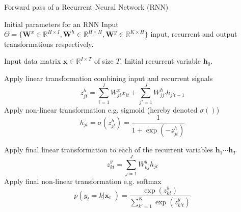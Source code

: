 \begin{algorithm}[th!]
\label{algo:rnnforward}
   \caption{Forward pass of a Recurrent Neural Network (RNN)}
\begin{algorithmic}[1]

    Initial parameters for an RNN Input
$\Theta=\{\mathbf{W}^x \in \mathbb{R}^{H \times I}, \mathbf{W}^h \in \mathbb{R}^{H \times H}, \mathbf{W}^y \in \mathbb{R}^{K \times H} \}$ input, recurrent and output transformations respectively.

    Input data matrix $\mathbf{x} \in \mathbb{R}^{I \times T}$ of size $T$. Initial recurrent variable $\mathbf{h}_0$. 

     \STATE Apply linear transformation combining input and recurrent signals
        $$z_{jt}^h = \sum_{i=1}^{I} W_{ji}^x x_{it} + \sum_{j'=1}^{J} W_{jj'}^h h_{j't-1}$$
     \STATE Apply non-linear transformation e.g. sigmoid (hereby denoted $\sigma()$)
     $$h_{jt} = \sigma(z_{jt}^h)  = \frac{1}{1+\exp(-z_{jt}^h)}$$

	\ENDFOR

\STATE Apply final linear transformation to each of the recurrent variables $\mathbf{h}_1 \cdots \mathbf{h}_T$ 
   $$z_{kt}^y = \sum_{j=1}^{J} W_{kj}^y h_{jt}$$
\STATE Apply final non-linear transformation e.g. softmax 
$$p(y_t=k|\mathbf{x}_{t:}) = \frac{\exp(z_{kt}^y)}{\sum_{k'=1}^{K} \exp(z_{k't}^y)}$$

\end{algorithmic}
\end{algorithm}

